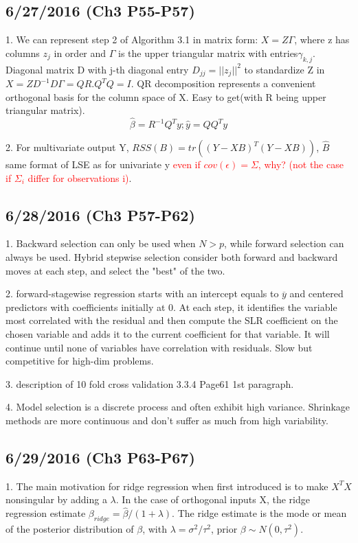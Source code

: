 \documentclass[a4paper, 12pt]{article}
\begin{document}
\subsection*{6/27/2016 (Ch3 P55-P57)}

1. We can represent step 2 of Algorithm 3.1 in matrix form: $X=Z\Gamma$, where z has columns $z_j$ in order and $\Gamma$ is the upper triangular matrix with entries$\hat{\gamma}_{k,j}$. Diagonal matrix D with j-th diagonal entry $D_{jj}=||z_j||^2$ to standardize Z in $X=ZD^{-1}D\Gamma=QR$.$Q^TQ=I$. QR decomposition represents a convenient orthogonal basis for the column space of X. Easy to get(with R being upper triangular matrix).
$$\hat{\beta}= R^{-1}Q^Ty; \hat{y}=QQ^Ty$$

2. For multivariate output Y, $RSS(B)=tr((Y-XB)^T(Y-XB))$, $\hat{B}$ same format of LSE as for univariate y \textcolor{red}{even if $cov(\epsilon)=\Sigma$, why? (not the case if $\Sigma_i$ differ for observations i)}.

\subsection*{6/28/2016 (Ch3 P57-P62)}

1. Backward selection can only be used when $N>p$, while forward selection can always be used. Hybrid stepwise selection consider both forward and backward moves at each step, and select the "best" of the two.

2.  forward-stagewise regression starts with an intercept equals to $\overline{y}$ and centered predictors with coefficients initially at 0. At each step, it identifies the variable most correlated with the residual and then compute the SLR coefficient on the chosen variable and adds it to the current coefficient for that variable. It will continue until none of variables have correlation with residuals. Slow but competitive for high-dim problems.

3. description of 10 fold cross validation 3.3.4 Page61 1st paragraph. 

4. Model selection is a discrete process and often exhibit high variance. Shrinkage methods are more continuous and don't suffer as much from high variability.

\subsection*{6/29/2016 (Ch3 P63-P67)}

1. The main motivation for ridge regression when first introduced is to make $X^TX$ nonsingular by adding a $\lambda$. In the case of orthogonal inputs X, the ridge regression estimate $\beta_{ridge}=\hat{\beta}/(1+\lambda)$. The ridge estimate is the mode or mean of the posterior distribution of $\beta$, with $\lambda=\sigma^2/\tau^2$, prior $\beta \sim N(0,\tau^2)$.
\end{document}
